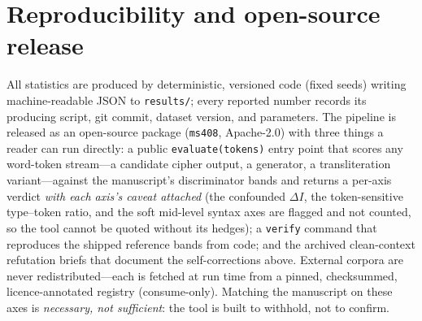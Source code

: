 \documentclass[11pt]{article}
\begin{document}
\section*{Reproducibility and open-source release}
All statistics are produced by deterministic, versioned code (fixed seeds) writing
machine-readable JSON to \texttt{results/}; every reported number records its
producing script, git commit, dataset version, and parameters. The pipeline is
released as an open-source package (\texttt{ms408}, Apache-2.0) with three things a
reader can run directly: a public \texttt{evaluate(tokens)} entry point that scores
any word-token stream---a candidate cipher output, a generator, a transliteration
variant---against the manuscript's discriminator bands and returns a per-axis verdict
\emph{with each axis's caveat attached} (the confounded $\Delta I$, the token-sensitive
type--token ratio, and the soft mid-level syntax axes are flagged and not counted, so the
tool cannot be quoted without its hedges); a \texttt{verify} command that reproduces the
shipped reference bands from code; and the archived clean-context refutation briefs that
document the self-corrections above. External corpora are never redistributed---each is
fetched at run time from a pinned, checksummed, licence-annotated registry (consume-only).
Matching the manuscript on these axes is \emph{necessary, not sufficient}: the tool is built
to withhold, not to confirm.



\end{document}
